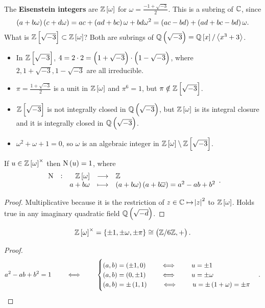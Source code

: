 The \textbf{Eisenstein integers} are $ \ZZ\sbr{\omega} $ for $ \omega = \tfrac{-1 + \sqrt{-3}}{2} $. This is a subring of $ \mathbb{C} $, since
$$ \br{a + b\omega}\br{c + d\omega} = ac + \br{ad + bc}\omega + bd\omega^2 = \br{ac - bd} + \br{ad + bc - bd}\omega. $$
What is $ \ZZ\sbr{\sqrt{-3}} \subset \ZZ\sbr{\omega} $? Both are subrings of $ \QQ\br{\sqrt{-3}} = \QQ\sbr{x} / \abr{x^3 + 3} $.
\begin{itemize}
\item In $ \ZZ\sbr{\sqrt{-3}} $, $ 4 = 2 \cdot 2 = \br{1 + \sqrt{-3}} \cdot \br{1 - \sqrt{-3}} $, where $ 2, 1 + \sqrt{-3}, 1 - \sqrt{-3} $ are all irreducible.
\item $ \pi = \tfrac{1 + \sqrt{-3}}{2} $ is a unit in $ \ZZ\sbr{\omega} $ and $ \pi^6 = 1 $, but $ \pi \notin \ZZ\sbr{\sqrt{-3}} $.
\item $ \ZZ\sbr{\sqrt{-3}} $ is not integrally closed in $ \QQ\br{\sqrt{-3}} $, but $ \ZZ\sbr{\omega} $ is its integral closure and it is integrally closed in $ \QQ\br{\sqrt{-3}} $.
\item $ \omega^2 + \omega + 1 = 0 $, so $ \omega $ is an algebraic integer in $ \ZZ\sbr{\omega} \setminus \ZZ\sbr{\sqrt{-3}} $.
\end{itemize}

\begin{proposition}
If $ u \in \ZZ\sbr{\omega}^\times $ then $ \N\br{u} = 1 $, where
$$ \function[\N]{\ZZ\sbr{\omega}}{\ZZ}{a + b\omega}{\br{a + b\omega}\br{a + b\overline{\omega}} = a^2 - ab + b^2}. $$
\end{proposition}

\begin{proof}
Multiplicative because it is the restriction of $ z \in \mathbb{C} \mapsto \abs{z}^2 $ to $ \ZZ\sbr{\omega} $. Holds true in any imaginary quadratic field $ \QQ\br{\sqrt{-d}} $.
\end{proof}

\begin{theorem}
$$ \ZZ\sbr{\omega}^\times = \cbr{\pm 1, \pm\omega, \pm\pi} \cong \br{\ZZ / 6\ZZ, +}. $$
\end{theorem}

\begin{proof}
$$ a^2 - ab + b^2 = 1 \qquad \iff \qquad
\begin{cases}
\br{a, b} = \br{\pm 1, 0} \qquad \iff \qquad u = \pm 1 \\
\br{a, b} = \br{0, \pm 1} \qquad \iff \qquad u = \pm\omega \\
\br{a, b} = \pm\br{1, 1} \qquad \iff \qquad u = \pm\br{1 + \omega} = \pm\pi
\end{cases}.
$$
\end{proof}


